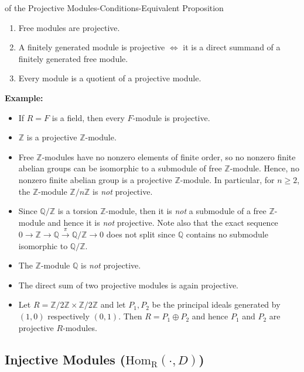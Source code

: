 \begin{corollary}{of the Projective Modules-Conditions-Equivalent Proposition}\\
\begin{enumerate}
    \item Free modules are projective.
    \item A finitely generated module is projective $\Leftrightarrow$ it is a direct summand of a finitely generated free module.
    \item Every module is a quotient of a projective module.
\end{enumerate}
\end{corollary}


\noindent\textbf{Example:} \begin{itemize}
    \item If $R=F$ is a field, then every $F$-module is projective.
    \item $\mathbb{Z}$ is a projective $\mathbb{Z}$-module.
    \item Free $\mathbb{Z}$-modules have no nonzero elements of finite order, so no nonzero finite abelian groups can be isomorphic to a submodule of free $\mathbb{Z}$-module. Hence, no nonzero finite abelian group is a projective $\mathbb{Z}$-module. In particular, for $n \geq 2$, the $\mathbb{Z}$-module $\mathbb{Z} /n\mathbb{Z}$ is \textit{not} projective.

    \item Since $\mathbb{Q} /\mathbb{Z}$ is a torsion $\mathbb{Z}$-module, then it is \textit{not} a submodule of a free $\mathbb{Z}$-module and hence it is \textit{not} projective. Note also that the exact sequence $0 \to \mathbb{Z} \to \mathbb{Q} \overset{\pi}{\to} \mathbb{Q} /\mathbb{Z} \to 0$ does not split since $\mathbb{Q}$ contains no submodule isomorphic to $\mathbb{Q} /\mathbb{Z}$.

    \item The $\mathbb{Z}$-module $\mathbb{Q}$ is \textit{not} projective.
    \item The direct sum of two projective modules is again projective.
    \item Let $R= \mathbb{Z}/2\mathbb{Z} \times \mathbb{Z}/2 \mathbb{Z}$ and let $P_1,P_2$ be the principal ideals generated by $(1,0)$ respectively $(0,1)$. Then $R =P_1 \oplus P_2$ and hence $P_1$ and $P_2$ are projective $R$-modules.
\end{itemize}

\subsection{Injective Modules ($\text{Hom}_\text{R} (\cdot ,D)$)}

